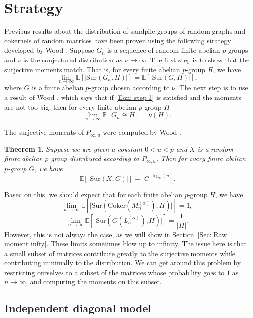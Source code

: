 \documentclass[12pt]{amsart}
\newtheorem{theorem}{Theorem}[section]
\theoremstyle{definition}
\newcommand{\PPP}{\mathbb{P}}
\newcommand{\Mna}{M_{n}^{(\alpha)}}
\newcommand{\Lna}{L_{n}^{(\alpha)}}
\newcommand{\abs}[1]{\vert#1\vert}
\newcommand{\E}{\mathbb{E}}
\newcommand{\Coker}{\text{Coker}}
\newcommand{\Sur}{\text{Sur}}
\begin{document}
\section{Strategy}\label{Sec: Strategy dir}

Previous results about the distribution of sandpile groups of random graphs and cokernels of random matrices have been proven using the following strategy developed by Wood \cite{wood2017distribution}. Suppose $G_n$ is a sequence of random finite abelian $p$-groups and $\nu$ is the conjectured distribution as $n\to\infty$.
The first step is to show that the surjective moments match. That is, for every finite abelian $p$-group $H$, we have
\begin{equation}\label{Eqn: step 1}
\lim_{n\to\infty} \E[\abs{\Sur(G_n,H)}]
=\E[\abs{\Sur(G,H)}],
\end{equation}
where $G$ is a finite abelian $p$-group chosen according to $\nu$.
The next step is to use a result of Wood \cite{wood2017distribution}, which says that if \eqref{Eqn: step 1} is satisfied and the moments are not too big, then for every finite abelian $p$-group $H$
\[
\lim_{n\to\infty} \PPP[G_n\cong H]
=\nu(H).
\]

The surjective moments of $P_{\infty,u}$ were computed by Wood \cite{wood2019random}.

\begin{theorem}\cite[Lemma 3.2]{wood2019random}\label{Thm: moments of P infty u}
Suppose we are given a constant $0<u<p$ and $X$ is a random finite abelian $p$-group distributed according to $P_{\infty,u}$,
Then for every finite abelian $p$-group $G$, we have
\[
\E[\abs{\Sur(X, G)}]
=\abs{G}^{\log_p(u)}.
\]
\end{theorem}

Based on this, we should expect that for each finite abelian $p$-group $H$, we have
\[
\lim_{n\to\infty}
\E[\abs{\Sur(\Coker(\Mna),H)}]
=1,
\]
\[
\lim_{n\to\infty}
\E[\abs{\Sur(G(\Lna),H)}]
=\frac{1}{\abs{H}}.
\]
However, this is not always the case, as we will show in Section~\ref{Sec: Raw moment infty}. These limits sometimes blow up to infinity.
The issue here is that a small subset of matrices contribute greatly to the surjective moments while contributing minimally to the distribution. We can get around this problem by restricting ourselves to a subset of the matrices whose probability goes to $1$ as $n\to\infty$, and computing the moments on this subset.

\subsection{Independent diagonal model}
\end{document}
